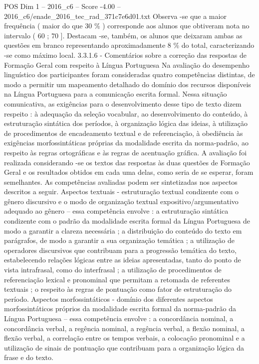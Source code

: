 \begin{textsample}{POS Dim 1 – 2016\_c6 – Score -4.00 – 2016\_c6/enade\_2016\_tec\_rad\_371c7e6d01.txt}
Observa -se que a maior frequência ( maior do que 30 \% ) corresponde aos alunos que obtiveram nota no intervalo ( 60 ; 70 ].
Destacam -se, também, os alunos que deixaram ambas as questões em branco representando aproximadamente 8 \% do total, caracterizando -se como máximo local. 3.3.1.6 - Comentários sobre a correção das respostas de Formação Geral com respeito à Língua Portuguesa Na avaliação do desempenho linguístico dos participantes foram consideradas quatro competências distintas, de modo a permitir um mapeamento detalhado do domínio dos recursos disponíveis na Língua Portuguesa para a comunicação escrita formal.
Nessa situação comunicativa, as exigências para o desenvolvimento desse tipo de texto dizem respeito : à adequação da seleção vocabular, ao desenvolvimento do conteúdo, à estruturação sintática dos períodos, à organização lógica das ideias, à utilização de procedimentos de encadeamento textual e de referenciação, à obediência às exigências morfossintáticas próprias da modalidade escrita da norma-padrão, ao respeito às regras ortográficas e às regras de acentuação gráfica.
A avaliação foi realizada considerando -se os textos das respostas às duas questões de Formação Geral e os resultados obtidos em cada uma delas, como seria de se esperar, foram semelhantes.
As competências avaliadas podem ser sintetizadas nos aspectos descritos a seguir.
Aspectos textuais - estruturação textual condizente com o gênero discursivo e o modo de organização textual expositivo/argumentativo adequado ao gênero – essa competência envolve : a estruturação sintática condizente com o padrão da modalidade escrita formal da Língua Portuguesa de modo a garantir a clareza necessária ; a distribuição do conteúdo do texto em parágrafos, de modo a garantir a sua organização temática ; a utilização de operadores discursivos que contribuam para a progressão temática do texto, estabelecendo relações lógicas entre as ideias apresentadas, tanto do ponto de vista intrafrasal, como do interfrasal ; a utilização de procedimentos de referenciação lexical e pronominal que permitam a retomada de referentes textuais ; o respeito às regras de pontuação como fator de estruturação do período.
Aspectos morfossintáticos - domínio dos diferentes aspectos morfossintáticos próprios da modalidade escrita formal da norma-padrão da Língua Portuguesa – essa competência envolve : a concordância nominal, a concordância verbal, a regência nominal, a regência verbal, a flexão nominal, a flexão verbal, a correlação entre os tempos verbais, a colocação pronominal e a utilização de sinais de pontuação que contribuam para a organização lógica da frase e do texto.

\end{textsample}
